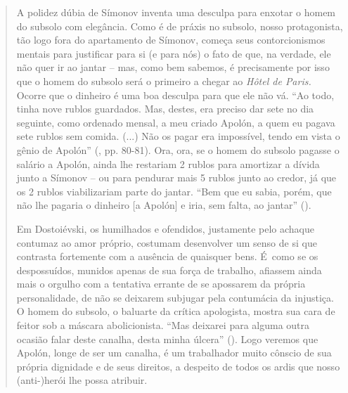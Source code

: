 {\begin{quote}
A polidez dúbia de Símonov inventa uma desculpa para enxotar o homem do
subsolo com elegância. Como é de práxis no subsolo, nosso protagonista,
tão logo fora do apartamento de Símonov, começa seus contorcionismos
mentais para justificar para si (e para nós) o fato de que, na verdade,
ele não quer ir ao jantar -- mas, como bem sabemos, é precisamente por
isso que o homem do subsolo será o primeiro a chegar ao \emph{Hôtel de
Paris.} Ocorre que o dinheiro é uma boa desculpa para que ele não vá.
``Ao todo, tinha nove rublos guardados. Mas, destes, era preciso dar
sete no dia seguinte, como ordenado mensal, a meu criado Apolón, a quem
eu pagava sete rublos sem comida. (...) Não os pagar era impossível,
tendo em vista o gênio de Apolón'' (, pp. 80-81). Ora, ora, se o
homem do subsolo pagasse o salário a Apolón, ainda lhe restariam 2
rublos para amortizar a dívida junto a Símonov -- ou para pendurar mais
5 rublos junto ao credor, já que os 2 rublos viabilizariam parte do
jantar. ``Bem que eu sabia, porém, que não lhe pagaria o dinheiro {[}a
Apolón{]} e iria, sem falta, ao jantar'' ().

Em Dostoiévski, os humilhados e ofendidos, justamente pelo achaque
contumaz ao amor próprio, costumam desenvolver um senso de si que
contrasta fortemente com a ausência de quaisquer bens. É~como se os
despossuídos, munidos apenas de sua força de trabalho, afiassem ainda
mais o orgulho com a tentativa errante de se apossarem da própria
personalidade, de não se deixarem subjugar pela contumácia da injustiça.
O homem do subsolo, o baluarte da crítica apologista, mostra sua cara de
feitor sob a máscara abolicionista. ``Mas deixarei para alguma outra
ocasião falar deste canalha, desta minha úlcera'' (). Logo veremos
que Apolón, longe de ser um canalha, é um trabalhador muito cônscio de
sua própria dignidade e de seus direitos, a despeito de todos os ardis
que nosso (anti-)herói lhe possa atribuir.


\end{quote}}
